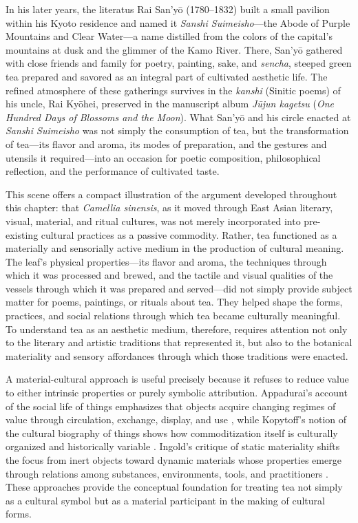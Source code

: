 \documentclass[numbers]{IntechOpen-Book}
\begin{document}
In his later years, the literatus Rai San'yō (1780--1832) built a small pavilion within his Kyoto residence and named it \textit{Sanshi Suimeisho}---the Abode of Purple Mountains and Clear Water---a name distilled from the colors of the capital's mountains at dusk and the glimmer of the Kamo River. There, San'yō gathered with close friends and family for poetry, painting, sake, and \textit{sencha}, steeped green tea prepared and savored as an integral part of cultivated aesthetic life. The refined atmosphere of these gatherings survives in the \textit{kanshi} (Sinitic poems) of his uncle, Rai Kyōhei, preserved in the manuscript album \textit{Jūjun kagetsu} (\textit{One Hundred Days of Blossoms and the Moon}). What San'yō and his circle enacted at \textit{Sanshi Suimeisho} was not simply the consumption of tea, but the transformation of tea---its flavor and aroma, its modes of preparation, and the gestures and utensils it required---into an occasion for poetic composition, philosophical reflection, and the performance of cultivated taste.

This scene offers a compact illustration of the argument developed throughout this chapter: that \textit{Camellia sinensis}, as it moved through East Asian literary, visual, material, and ritual cultures, was not merely incorporated into pre-existing cultural practices as a passive commodity. Rather, tea functioned as a materially and sensorially active medium in the production of cultural meaning. The leaf's physical properties---its flavor and aroma, the techniques through which it was processed and brewed, and the tactile and visual qualities of the vessels through which it was prepared and served---did not simply provide subject matter for poems, paintings, or rituals about tea. They helped shape the forms, practices, and social relations through which tea became culturally meaningful. To understand tea as an aesthetic medium, therefore, requires attention not only to the literary and artistic traditions that represented it, but also to the botanical materiality and sensory affordances through which those traditions were enacted.

A material-cultural approach is useful precisely because it refuses to reduce value to either intrinsic properties or purely symbolic attribution. Appadurai's account of the social life of things emphasizes that objects acquire changing regimes of value through circulation, exchange, display, and use \cite{appadurai1986}, while Kopytoff's notion of the cultural biography of things shows how commoditization itself is culturally organized and historically variable \cite{kopytoff1986}. Ingold's critique of static materiality shifts the focus from inert objects toward dynamic materials whose properties emerge through relations among substances, environments, tools, and practitioners \cite{ingold2007,ingold2013}. These approaches provide the conceptual foundation for treating tea not simply as a cultural symbol but as a material participant in the making of cultural forms.
\end{document}
